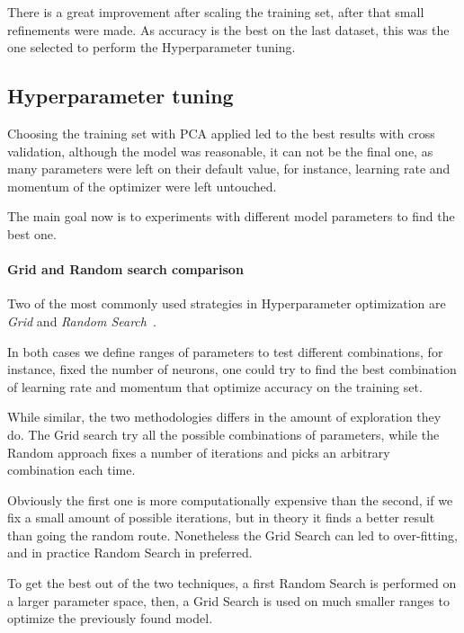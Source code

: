 There is a great improvement after scaling the training set, after 
that small refinements were made.
As accuracy is the best on the last dataset, this was the one selected to 
perform the Hyperparameter tuning.

\subsection{Hyperparameter tuning}

Choosing the training set with PCA applied led to the best results 
with cross validation, although the model was reasonable, it can not be the 
final one, as many parameters were left on their default value, for instance, 
learning rate and momentum of the optimizer were left untouched. 

The main goal now is to experiments with different model parameters 
to find the best one.

\paragraph{Grid and Random search comparison}
Two of the most commonly used strategies in Hyperparameter optimization
are \emph{Grid} and \emph{Random Search}~\cite{random-grid}. 

In both cases we define ranges of parameters to test different combinations, 
for instance, fixed the number of neurons, one could try to find the best 
combination of learning rate and momentum that optimize accuracy on the training set.

While similar, the two methodologies differs in the amount of exploration they do.
The Grid search try all the possible combinations of parameters, while the 
Random approach fixes a number of iterations and picks an arbitrary combination each time. 

Obviously the first one is more computationally expensive than the second, if 
we fix a small amount of possible iterations, but in theory it finds a better result
than going the random route. 
Nonetheless the Grid Search can led to over-fitting, and in practice Random 
Search in preferred.

To get the best out of the two techniques, a first Random Search is performed 
on a larger parameter space, then, a Grid Search is used on much smaller 
ranges to optimize the previously found model.

